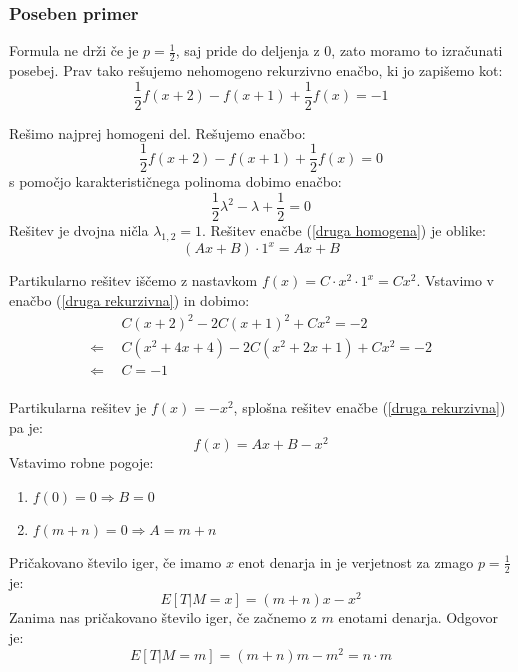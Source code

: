 \documentclass[12pt, a4paper]{article}
\begin{document}
\subsubsection{Poseben primer}
\label{Posebni primer za 1/2}
Formula ne drži če je $p = \frac{1}{2}$, saj pride do deljenja z 0, zato moramo to izračunati posebej. Prav tako rešujemo nehomogeno rekurzivno enačbo, ki jo zapišemo kot: 
\begin{equation}
\label{druga rekurzivna}
\frac{1}{2}f(x+2)-f(x+1)+\frac{1}{2}f(x)=-1
\end{equation}

Rešimo najprej homogeni del. Rešujemo enačbo: $$\frac{1}{2}f(x+2)-f(x+1)+\frac{1}{2}f(x)=0$$ s pomočjo karakterističnega polinoma dobimo enačbo: 
\begin{equation}
\label{druga homogena}
\frac{1}{2}\lambda^2-\lambda+\frac{1}{2}=0
\end{equation} 
Rešitev je dvojna ničla $\lambda_{1, 2}= 1$. Rešitev enačbe (\ref{druga homogena}) je oblike: $$(Ax+B)\cdot 1^x=Ax+B$$

Partikularno rešitev iščemo z nastavkom $f(x)=C\cdot x^2\cdot 1^x= Cx^2$. Vstavimo v enačbo (\ref{druga rekurzivna}) in dobimo:
\begin{equation*}
\begin{split}
 & ~~C(x+2)^2-2C(x+1)^2+Cx^2=-2\\
\Leftarrow & ~~C(x^2+4x+4)-2C(x^2+2x+1)+Cx^2=-2\\
\Leftarrow &  ~~C = -1 \\
\end{split}
\end{equation*}

Partikularna rešitev je $f(x)=-x^2$, splošna rešitev enačbe (\ref{druga rekurzivna}) pa je: $$f(x)=Ax+B-x^2$$
Vstavimo robne pogoje:
\begin{enumerate}
\item $f(0)=0\Rightarrow B = 0$
\item $f(m+n)=0 \Rightarrow A = m+n$
\end{enumerate}
Pričakovano število iger, če imamo $x$ enot denarja in je verjetnost za zmago $p=\frac{1}{2}$ je: $$E[T|M=x]= (m+n)x-x^2$$
Zanima nas pričakovano število iger, če začnemo z $m$ enotami denarja. Odgovor je:$$E[T|M=m]=(m+n)m-m^2= n\cdot m$$

\newpage
\end{document}
